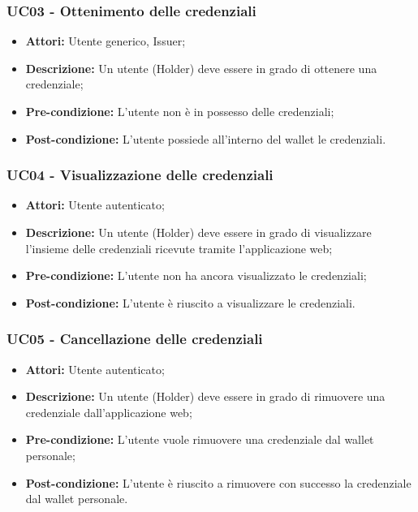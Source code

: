 \subsubsection{UC03 - Ottenimento delle credenziali}
\begin{itemize}
\item \textbf{Attori:} Utente generico, Issuer;
\item \textbf{Descrizione:} Un utente (Holder) deve essere in grado di ottenere una credenziale;
\item\textbf{Pre-condizione:} L’utente non è in possesso delle credenziali;
\item \textbf{Post-condizione:} L’utente possiede all’interno del wallet le credenziali.
\end{itemize}

\subsubsection{UC04 - Visualizzazione delle credenziali}
\begin{itemize}
\item \textbf{Attori:} Utente autenticato;
\item \textbf{Descrizione:} Un utente (Holder) deve essere in grado di visualizzare l'insieme delle credenziali ricevute tramite l'applicazione web;
\item \textbf{Pre-condizione:} L’utente non ha ancora visualizzato le credenziali;
\item \textbf{Post-condizione:} L’utente è riuscito a visualizzare le credenziali.
\end{itemize}

\subsubsection{UC05 - Cancellazione delle credenziali}
\begin{itemize}
\item \textbf{Attori:} Utente autenticato;
\item \textbf{Descrizione:} Un utente (Holder) deve essere in grado di rimuovere una credenziale dall'applicazione web;
\item \textbf{Pre-condizione:} L’utente vuole rimuovere una credenziale dal wallet personale;
\item \textbf{Post-condizione:} L’utente è riuscito a rimuovere con successo la credenziale dal wallet personale.
\end{itemize}

